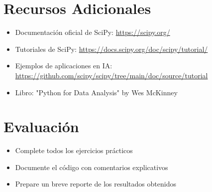 \documentclass[12pt,a4paper]{article}
\begin{document}
\section*{Recursos Adicionales}
\begin{itemize}
    \item Documentación oficial de SciPy: \url{https://scipy.org/}
    \item Tutoriales de SciPy: \url{https://docs.scipy.org/doc/scipy/tutorial/}
    \item Ejemplos de aplicaciones en IA: \url{https://github.com/scipy/scipy/tree/main/doc/source/tutorial}
    \item Libro: "Python for Data Analysis" by Wes McKinney
\end{itemize}

\section*{Evaluación}
\begin{itemize}
    \item Complete todos los ejercicios prácticos
    \item Documente el código con comentarios explicativos
    \item Prepare un breve reporte de los resultados obtenidos
\end{itemize}
\end{document}
